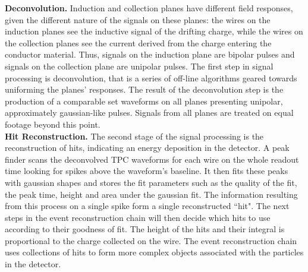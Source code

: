 \documentclass[aps,prl,twocolumn,showpacs,superscriptaddress,groupedaddress]{revtex4}  %
\begin{document}
\textbf{Deconvolution.} Induction and collection planes have different field responses, given the different nature of the signals on these planes: the wires on the induction planes see the inductive signal of the drifting charge, while the wires on the collection planes see the current derived from the charge entering the conductor material. Thus, signals on the induction plane are bipolar pulses and signals on the collection plane are unipolar pulses. %
The first step in signal processing is deconvolution, that is a series of off-line algorithms geared towards uniforming the planes'  responses. The result of the deconvolution step is  the production of  a comparable set waveforms on all planes presenting unipolar, approximately gaussian-like pulses. %
Signals from all planes are treated on equal footage beyond this point.\\


\textbf{Hit Reconstruction.} The second stage of the signal processing is the reconstruction of hits, indicating an energy deposition in the detector.  A peak finder scans the deconvolved TPC waveforms for each wire on the whole readout time looking for spikes  above  the waveform's baseline. It then fits these peaks with gaussian shapes and stores the fit parameters such as the quality of the fit, the peak time, height and area under the gaussian fit. The information resulting from this process on a single spike form a single reconstructed ``hit". %
 The next steps in the event reconstruction chain will then decide which hits to use according to their goodness of fit. %
The height of the hits and their integral is proportional to the charge collected on the wire.
The event reconstruction chain uses collections of hits to form more complex objects associated with the particles in the detector. 

\end{document}
